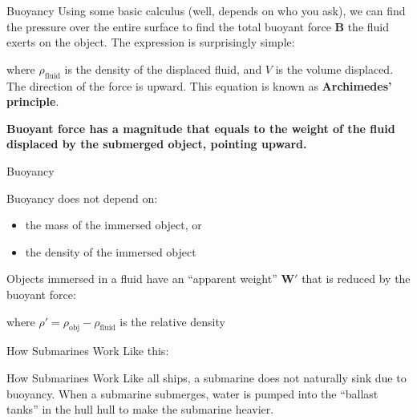 \documentclass[12pt,aspectratio=169]{beamer}
\begin{document}
\begin{frame}{Buoyancy}
  Using some basic calculus (well, depends on who you ask), we can find the
  pressure over the entire surface to find the total buoyant force $\bm{B}$ the
  fluid exerts on the object. The expression is surprisingly simple:
  
  
  where $\rho_\text{fluid}$ is the density of the displaced fluid, and
  $V$ is the volume displaced. The direction of the force is upward. This
  equation is known as \textbf{Archimedes' principle}.
  
  \vspace{.25in}\textbf{Buoyant force has a magnitude that equals to the
    weight of the fluid displaced by the submerged object, pointing upward.}
\end{frame}



\begin{frame}{Buoyancy}


  Buoyancy does not depend on:
  \begin{itemize}
  \item the mass of the immersed object, or
  \item the density of the immersed object
  \end{itemize}

  \vspace{.15in}Objects immersed in a fluid have an ``apparent weight''
  $\bm{W}'$ that is reduced by the buoyant force:

  
  where $\rho'=\rho_\text{obj}-\rho_\text{fluid}$ is the relative density
\end{frame}



\begin{frame}{How Submarines Work}
  Like this:
  \begin{center}
  \end{center}
\end{frame}



\begin{frame}{How Submarines Work}
  Like all ships, a submarine does not naturally sink due to buoyancy. When a
  submarine submerges, water is pumped into the  ``ballast tanks'' in the hull
  hull to make the submarine heavier.
  \begin{center}
  \end{center}
\end{frame}
\end{document}
